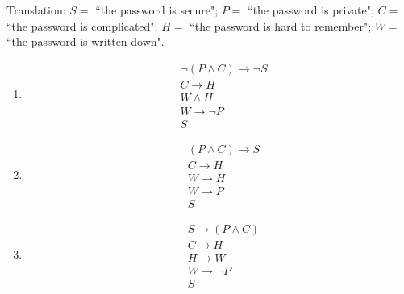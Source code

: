 \documentclass[12pt, oneside]{article}
\begin{document}
\begin{enumerate}
\begin{enumerate}
    Translation: $S =$ ``the password is secure"; $P = $ ``the password is private"; 
    $C = $  ``the password is  complicated"; $H = $ ``the password is hard to remember";
    $W =  $ ``the password is written down".
    
    \begin{enumerate}
        \item \begin{align*} &\neg (P \wedge C) \to \neg  S  \\ & C \to H  \\ & W \wedge H \\ & W \to  \neg P \\ & S \end{align*}
        \item \begin{align*} &(P \wedge  C)  \to S  \\ &  C \to H\\ & W  \to  H \\  & W \to P \\ & S\end{align*}
        \item \begin{align*} & S  \to (P \wedge C)  \\ &  C \to H\\ & H  \to  W \\  & W \to \neg P \\ & S\end{align*}
\end{enumerate}

\end{enumerate} \end{enumerate}
\end{document}
